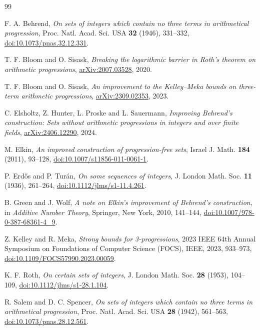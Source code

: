 \documentclass[11pt]{article}
\theoremstyle{plain}
\theoremstyle{remark}
\begin{document}
\begin{thebibliography}{99}

F. A. Behrend,
\emph{On sets of integers which contain no three terms in arithmetical progression},
Proc. Natl. Acad. Sci. USA \textbf{32} (1946), 331--332,
\href{https://doi.org/10.1073/pnas.32.12.331}{doi:10.1073/pnas.32.12.331}.

T. F. Bloom and O. Sisask,
\emph{Breaking the logarithmic barrier in Roth's theorem on arithmetic progressions},
\href{https://arxiv.org/abs/2007.03528}{arXiv:2007.03528}, 2020.

T. F. Bloom and O. Sisask,
\emph{An improvement to the Kelley--Meka bounds on three-term arithmetic progressions},
\href{https://arxiv.org/abs/2309.02353}{arXiv:2309.02353}, 2023.

C. Elsholtz, Z. Hunter, L. Proske and L. Sauermann,
\emph{Improving Behrend's construction: Sets without arithmetic progressions in integers and over finite fields},
\href{https://arxiv.org/abs/2406.12290}{arXiv:2406.12290}, 2024.

M. Elkin,
\emph{An improved construction of progression-free sets},
Israel J. Math. \textbf{184} (2011), 93--128,
\href{https://doi.org/10.1007/s11856-011-0061-1}{doi:10.1007/s11856-011-0061-1}.

P. Erd\H{o}s and P. Tur\'an,
\emph{On some sequences of integers},
J. London Math. Soc. \textbf{11} (1936), 261--264,
\href{https://doi.org/10.1112/jlms/s1-11.4.261}{doi:10.1112/jlms/s1-11.4.261}.

B. Green and J. Wolf,
\emph{A note on Elkin's improvement of Behrend's construction},
in \emph{Additive Number Theory}, Springer, New York, 2010, 141--144,
\href{https://doi.org/10.1007/978-0-387-68361-4_9}{doi:10.1007/978-0-387-68361-4\_9}.

Z. Kelley and R. Meka,
\emph{Strong bounds for 3-progressions},
2023 IEEE 64th Annual Symposium on Foundations of Computer Science (FOCS), IEEE, 2023, 933--973,
\href{https://doi.org/10.1109/FOCS57990.2023.00059}{doi:10.1109/FOCS57990.2023.00059}.

K. F. Roth,
\emph{On certain sets of integers},
J. London Math. Soc. \textbf{28} (1953), 104--109,
\href{https://doi.org/10.1112/jlms/s1-28.1.104}{doi:10.1112/jlms/s1-28.1.104}.

R. Salem and D. C. Spencer,
\emph{On sets of integers which contain no three terms in arithmetical progression},
Proc. Natl. Acad. Sci. USA \textbf{28} (1942), 561--563,
\href{https://doi.org/10.1073/pnas.28.12.561}{doi:10.1073/pnas.28.12.561}.

\end{thebibliography}
\end{document}
